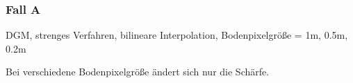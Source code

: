 \documentclass[12pt]{article}
\begin{document}
\subsubsection{Fall A}
DGM, strenges Verfahren, bilineare Interpolation, Bodenpixelgröße = 1m, 0.5m, 0.2m 
\begin{figure}[ht]\centering
\end{figure}
\newline
Bei verschiedene Bodenpixelgröße ändert sich nur die Schärfe.
\newpage
\end{document}
